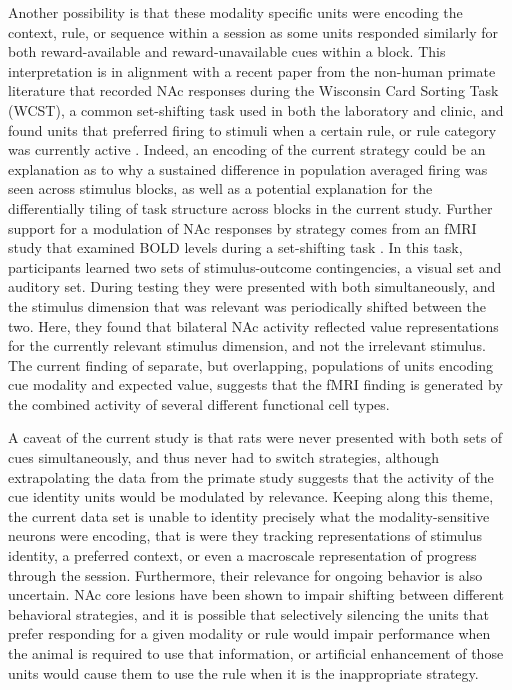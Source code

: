 \documentclass[11pt]{article}
\let\cite=\citep
\begin{document}
{Another possibility is that these modality specific units were encoding the context, rule, or sequence within a session as some units responded similarly for both reward-available and reward-unavailable cues within a block. This interpretation is in alignment with a recent paper from the non-human primate literature that recorded NAc responses during the Wisconsin Card Sorting Task (WCST), a common set-shifting task used in both the laboratory and clinic, and found units that preferred firing to stimuli when a certain rule, or rule category was currently active \cite{Sleezer2016}. Indeed, an encoding of the current strategy could be an explanation as to why a sustained difference in population averaged firing was seen across stimulus blocks, as well as a potential explanation for the differentially tiling of task structure across blocks in the current study. Further support for a modulation of NAc responses by strategy comes from an fMRI study that examined BOLD levels during a set-shifting task \cite{Fitzgerald2014}. In this task, participants learned two sets of stimulus-outcome contingencies, a visual set and auditory set. During testing they were presented with both simultaneously, and the stimulus dimension that was relevant was periodically shifted between the two. Here, they found that bilateral NAc activity reflected value representations for the currently relevant stimulus dimension, and not the irrelevant stimulus. The current finding of separate, but overlapping, populations of units encoding cue modality and expected value, suggests that the fMRI finding is generated by the combined activity of several different functional cell types.

A caveat of the current study is that rats were never presented with both sets of cues simultaneously, and thus never had to switch strategies, although extrapolating the data from the primate study suggests that the activity of the cue identity units would be modulated by relevance. Keeping along this theme, the current data set is unable to identity precisely what the modality-sensitive neurons were encoding, that is were they tracking representations of stimulus identity, a preferred context, or even a macroscale representation of progress through the session. Furthermore, their relevance for ongoing behavior is also uncertain. NAc core lesions have been shown to impair shifting between different behavioral strategies, and it is possible that selectively silencing the units that prefer responding for a given modality or rule would impair performance when the animal is required to use that information, or artificial enhancement of those units would cause them to use the rule when it is the inappropriate strategy.

}
\end{document}
